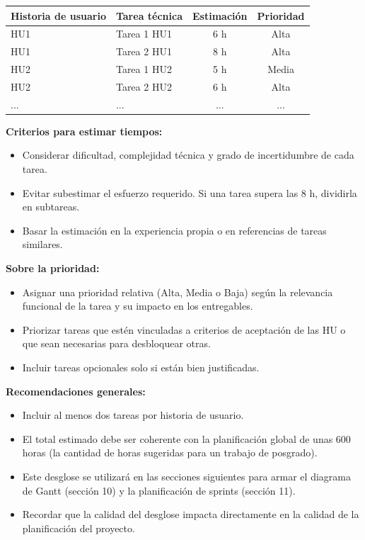 \documentclass[
11pt, %
]{charter}
\begin{document}
\begin{table}[htpb]
\centering
\begin{tabularx}{\linewidth}{@{}|X|X|c|c|@{}}
\hline
\rowcolor[HTML]{C0C0C0}
Historia de usuario & Tarea técnica & Estimación & Prioridad \\ \hline
HU1 & Tarea 1 HU1 & 6 h & Alta \\ \hline
HU1 & Tarea 2 HU1 & 8 h & Alta \\ \hline
HU2 & Tarea 1 HU2 & 5 h & Media \\ \hline
HU2 & Tarea 2 HU2 & 6 h & Alta \\ \hline
... & ... & ... & ... \\ \hline
\end{tabularx}
\end{table}

\textbf{Criterios para estimar tiempos:}
\begin{itemize}
  \item Considerar dificultad, complejidad técnica y grado de incertidumbre de cada tarea.
  \item Evitar subestimar el esfuerzo requerido. Si una tarea supera las 8 h, dividirla en subtareas.
  \item Basar la estimación en la experiencia propia o en referencias de tareas similares.
\end{itemize}

\textbf{Sobre la prioridad:}
\begin{itemize}
  \item Asignar una prioridad relativa (Alta, Media o Baja) según la relevancia funcional de la tarea y su impacto en los entregables.
  \item Priorizar tareas que estén vinculadas a criterios de aceptación de las HU o que sean necesarias para desbloquear otras.
  \item Incluir tareas opcionales solo si están bien justificadas.
\end{itemize}

\textbf{Recomendaciones generales:}
\begin{itemize}
  \item Incluir al menos dos tareas por historia de usuario.
  \item El total estimado debe ser coherente con la planificación global de unas 600 horas (la cantidad de horas sugeridas para un trabajo de posgrado).
  \item Este desglose se utilizará en las secciones siguientes para armar el diagrama de Gantt (sección 10) y la planificación de sprints (sección 11).
  \item Recordar que la calidad del desglose impacta directamente en la calidad de la planificación del proyecto.
\end{itemize}
\end{document}
